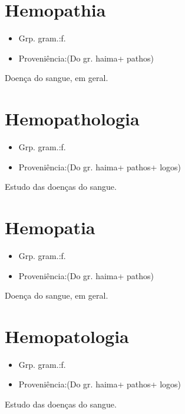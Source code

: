 \documentclass{article}
\begin{document}
\section{Hemopathia}
\begin{itemize}
\item {Grp. gram.:f.}
\end{itemize}
\begin{itemize}
\item {Proveniência:(Do gr. \textunderscore haima\textunderscore  + \textunderscore pathos\textunderscore )}
\end{itemize}
Doença do sangue, em geral.
\section{Hemopathologia}
\begin{itemize}
\item {Grp. gram.:f.}
\end{itemize}
\begin{itemize}
\item {Proveniência:(Do gr. \textunderscore haima\textunderscore  + \textunderscore pathos\textunderscore  + \textunderscore logos\textunderscore )}
\end{itemize}
Estudo das doenças do sangue.
\section{Hemopatia}
\begin{itemize}
\item {Grp. gram.:f.}
\end{itemize}
\begin{itemize}
\item {Proveniência:(Do gr. \textunderscore haima\textunderscore  + \textunderscore pathos\textunderscore )}
\end{itemize}
Doença do sangue, em geral.
\section{Hemopatologia}
\begin{itemize}
\item {Grp. gram.:f.}
\end{itemize}
\begin{itemize}
\item {Proveniência:(Do gr. \textunderscore haima\textunderscore  + \textunderscore pathos\textunderscore  + \textunderscore logos\textunderscore )}
\end{itemize}
Estudo das doenças do sangue.
\end{document}

